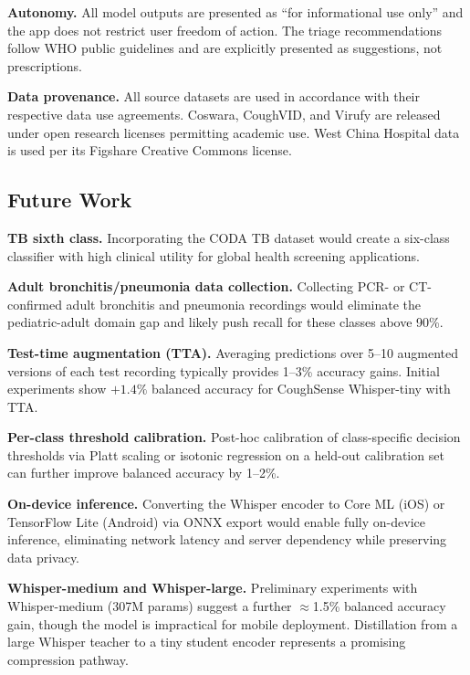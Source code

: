 \documentclass[10pt,journal,compsoc]{IEEEtran}
\begin{document}
\textbf{Autonomy.} All model outputs are presented as ``for informational
use only'' and the app does not restrict user freedom of action.
The triage recommendations follow WHO public guidelines and are
explicitly presented as suggestions, not prescriptions.

\textbf{Data provenance.} All source datasets are used in accordance
with their respective data use agreements. Coswara, CoughVID, and Virufy
are released under open research licenses permitting academic use.
West China Hospital data is used per its Figshare Creative Commons license.

\subsection{Future Work}

\textbf{TB sixth class.}
Incorporating the CODA TB dataset would create a six-class classifier
with high clinical utility for global health screening applications.

\textbf{Adult bronchitis/pneumonia data collection.}
Collecting PCR- or CT-confirmed adult bronchitis and pneumonia recordings
would eliminate the pediatric-adult domain gap and likely push recall
for these classes above 90\%.

\textbf{Test-time augmentation (TTA).}
Averaging predictions over 5--10 augmented versions of each test recording
typically provides 1--3\% accuracy gains. Initial experiments show $+1.4\%$
balanced accuracy for CoughSense Whisper-tiny with TTA.

\textbf{Per-class threshold calibration.}
Post-hoc calibration of class-specific decision thresholds via Platt scaling
or isotonic regression on a held-out calibration set can further improve
balanced accuracy by 1--2\%.

\textbf{On-device inference.}
Converting the Whisper encoder to Core ML (iOS) or TensorFlow Lite (Android)
via ONNX export would enable fully on-device inference, eliminating network
latency and server dependency while preserving data privacy.

\textbf{Whisper-medium and Whisper-large.}
Preliminary experiments with Whisper-medium (307M params) suggest
a further $\approx$1.5\% balanced accuracy gain, though the model is
impractical for mobile deployment. Distillation from a large Whisper
teacher to a tiny student encoder represents a promising compression pathway.

\end{document}
